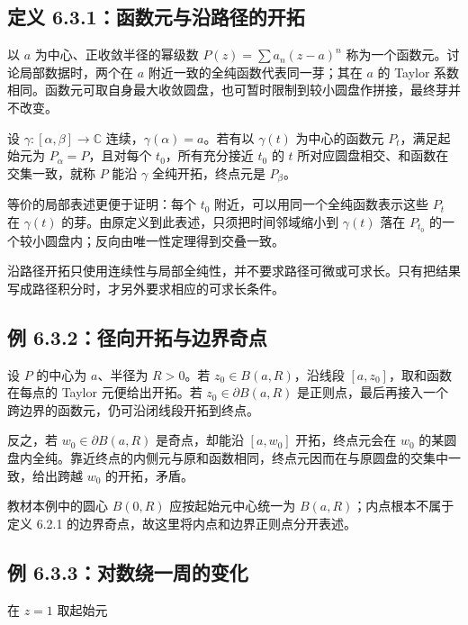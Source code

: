 \documentclass[11pt,a4paper]{article}
\begin{document}
\subsection{定义 6.3.1：函数元与沿路径的开拓}\label{ch06-s3-heading-1}

以 \(a\) 为中心、正收敛半径的幂级数 \(P(z)=\sum a_n(z-a)^n\)
称为一个函数元。讨论局部数据时，两个在 \(a\)
附近一致的全纯函数代表同一芽；其在 \(a\) 的 Taylor
系数相同。函数元可取自身最大收敛圆盘，也可暂时限制到较小圆盘作拼接，最终芽并不改变。

设 \(\gamma:[\alpha,\beta]\to\mathbb C\)
连续，\(\gamma(\alpha)=a\)。若有以 \(\gamma(t)\) 为中心的函数元
\(P_t\)，满足起始元为 \(P_\alpha=P\)，且对每个 \(t_0\)，所有充分接近
\(t_0\) 的 \(t\) 所对应圆盘相交、和函数在交集一致，就称 \(P\) 能沿
\(\gamma\) 全纯开拓，终点元是 \(P_\beta\)。

等价的局部表述更便于证明：每个 \(t_0\)
附近，可以用同一个全纯函数表示这些 \(P_t\) 在 \(\gamma(t)\)
的芽。由原定义到此表述，只须把时间邻域缩小到 \(\gamma(t)\) 落在
\(P_{t_0}\) 的一个较小圆盘内；反向由唯一性定理得到交叠一致。

沿路径开拓只使用连续性与局部全纯性，并不要求路径可微或可求长。只有把结果写成路径积分时，才另外要求相应的可求长条件。

\subsection{例 6.3.2：径向开拓与边界奇点}\label{ch06-s3-heading-2}

设 \(P\) 的中心为 \(a\)、半径为 \(R>0\)。若 \(z_0\in B(a,R)\)，沿线段
\([a,z_0]\)，取和函数在每点的 Taylor 元便给出开拓。若
\(z_0\in\partial B(a,R)\)
是正则点，最后再接入一个跨边界的函数元，仍可沿闭线段开拓到终点。

反之，若 \(w_0\in\partial B(a,R)\) 是奇点，却能沿 \([a,w_0]\)
开拓，终点元会在 \(w_0\)
的某圆盘内全纯。靠近终点的内侧元与原和函数相同，终点元因而在与原圆盘的交集中一致，给出跨越
\(w_0\) 的开拓，矛盾。

教材本例中的圆心 \(B(0,R)\) 应按起始元中心统一为
\(B(a,R)\)；内点根本不属于定义 6.2.1
的边界奇点，故这里将内点和边界正则点分开表述。

\subsection{例 6.3.3：对数绕一周的变化}\label{ch06-s3-heading-3}

在 \(z=1\) 取起始元
\end{document}
